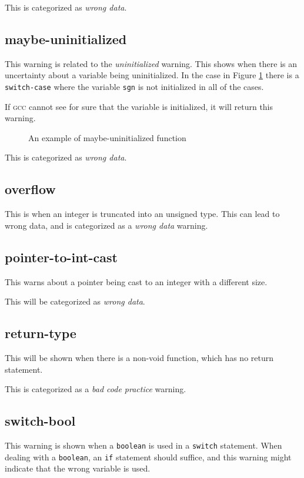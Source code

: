 \documentclass[a4paper,11pt]{report}
\newcommand{\textcode}[1]{\fboxsep=1pt\texttt{\colorbox{gray!20}{#1}}}
\newcommand{\figa}{
    \begin{figure}[!htpb]
    \centering
}
\newcommand{\figb}[2]{
    \caption{#1}
    \label{#2}
    \end{figure}
}
\begin{document}
This is categorized as \emph{wrong data}.

            \fi %


            \subsection*{maybe-uninitialized}
This warning is related to the \emph{uninitialized} warning. This shows when 
there is an uncertainty about a variable being uninitialized. In the 
case in Figure \ref{lst:maybeuninitializedreal} there is a \texttt{switch-case} 
where the variable \textcode{sgn} is not initialized in all of the cases.

If \textsc{gcc} cannot see for sure that the variable is initialized, it will 
return this warning.

\figa
    \subfigure{
        
    }
\figb{An example of maybe-uninitialized function}{lst:maybeuninitializedreal}

This is categorized as \emph{wrong data}.


            \subsection*{overflow}
This is when an integer is truncated into an unsigned type. This can lead to 
wrong data, and is categorized as a \emph{wrong data} warning.


            \subsection*{pointer-to-int-cast}
This warns about a pointer being cast to an integer with a different size.

This will be categorized as \emph{wrong data}.


            \subsection*{return-type}
This will be shown when there is a non-void function, which has no return 
statement.

This is categorized as a \emph{bad code practice} warning.


            \iffalse %

            \subsection*{switch-bool}
This warning is shown when a \texttt{boolean} is used in a \texttt{switch} 
statement. When dealing with a \texttt{boolean}, an \texttt{if} statement 
should suffice, and this warning might indicate that the wrong variable is used.
\end{document}
